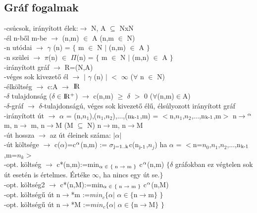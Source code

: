 \documentclass{article}
\begin{document}
	\subsection{Gráf fogalmak}
	-csúcsok, irányított élek:$\rightarrow$ N, A $\subseteq$ NxN\\
	-él n-ből m-be $\rightarrow$ (n,m) $\in$ A (n,m $\in$ N)\\
	-n utódai $\rightarrow$ $\gamma$ (n) = $\{$ m $\in$ N $\mid$ (n,m) $\in$ A $\}$\\
	-n szülei $\rightarrow$ $\pi$(n) $\in$ $\Pi$(n) = $\{$ m $\in$ N $\mid$ (m,n) $\in$ A $\}$\\
	-irányított gráf $\rightarrow$ R=(N,A)\\
	-véges sok kivezető él $\rightarrow$ $\mid$ $\gamma$ (n) $\mid$ $<$ $\infty$ ($\forall$ n $\in$ N)\\
	-élköltség $\rightarrow$ c:A $\rightarrow$ ${\rm I\!R}$\\
	-$\delta$ tulajdonság ($\delta$$\in$${\rm I\!R^+}$) $\rightarrow$ c(n,m) $\geq$ $\delta$ $>$ 0 ($\forall$(n,m)$\in$A)\\
	-$\delta$-gráf $\rightarrow$ $\delta$-tulajdonságú, véges sok kivezető élű, élsúlyozott irányított gráf\\
	-irányított út $\rightarrow$ $\alpha$ = (n,$n_1$),($n_1$,$n_2$),...,(n$\textsubscript{k-1}$,m) = $<$n,$n_1$,$n_2$,...,n$\textsubscript{k-1}$,m$>$ n$\rightarrow$$\textsuperscript{$\alpha$}$m, n$\rightarrow$ m, n$\rightarrow$M (M $\subseteq$ N) {n$\rightarrow$m}, {n$\rightarrow$M}\\
	-út hossza $\rightarrow$ az út éleinek száma: $|$$\alpha$$|$\\
	-út költsége $\rightarrow$ c($\alpha$)=c$\textsuperscript{$\alpha$}$(n,m) :=  $\sigma$$\textsubscript{j=1..k}$c(n$\textsubscript{j-1}$,$n_j$) ha $\alpha$ = $<$n=$n_0$,$n_1$,$n_2$,...,n$\textsubscript{k-1}$,m=$n_k$$>$\\
	-opt. költség $\rightarrow$ c*(n,m):=min$\textsubscript{$\alpha$ $\in$ $\{$ n $\rightarrow$ m $\}$ }$c$\textsuperscript{$\alpha$}$(n,m) $\{$$\delta$ gráfokban ez végtelen sok út esetén is értelmes. Értéke $\infty$, ha nincs egy út se.$\}$ \\
	-opt. költség2 $\rightarrow$ c*(n,M):=min$\textsubscript{$\alpha$ $\in$ $\{$ n $\rightarrow$ m $\}$ }$c$\textsuperscript{$\alpha$}$(n,M) \\
	-opt. költségű út n$\rightarrow$*m :=$min_c$$\{$$\alpha$$|$ $\alpha$$\in$$\{$n$\rightarrow$m$\}$ $\}$ \\
	-opt. költségű út n$\rightarrow$*M :=$min_c$$\{$$\alpha$$|$ $\alpha$$\in$$\{$n$\rightarrow$M$\}$ $\}$ \\
	
\end{document}
